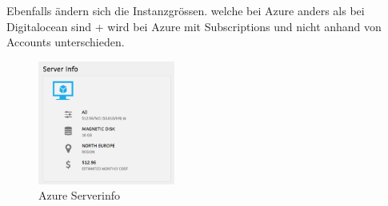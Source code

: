 Ebenfalls ändern sich die Instanzgrössen. welche bei Azure anders als bei 
Digitalocean sind + wird bei Azure mit Subscriptions und nicht anhand von 
Accounts unterschieden.


\begin{figure}[!htbp]
\centering
\includegraphics[width=0.4\textwidth]{./03_Analyse/03_Bitnami/images/azure_serverinfo}
\caption{Azure Serverinfo}
\end{figure}

